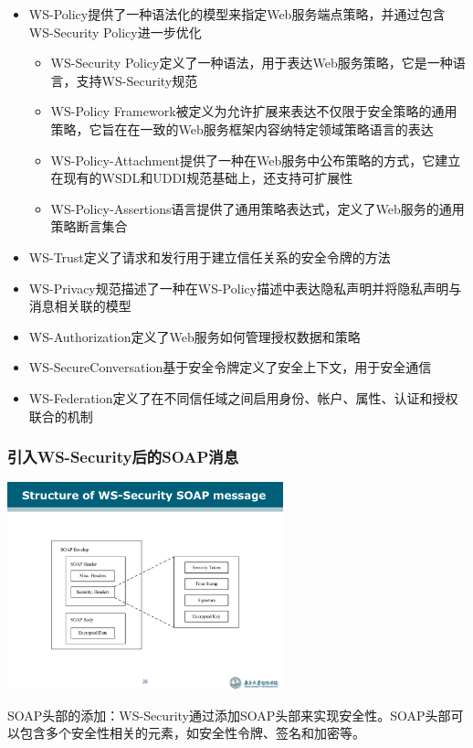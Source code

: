 \begin{itemize}
    \item WS-Policy提供了一种语法化的模型来指定Web服务端点策略，并通过包含WS-Security Policy进一步优化
    \begin{itemize}
        \item WS-Security Policy定义了一种语法，用于表达Web服务策略，它是一种语言，支持WS-Security规范
        \item WS-Policy Framework被定义为允许扩展来表达不仅限于安全策略的通用策略，它旨在在一致的Web服务框架内容纳特定领域策略语言的表达
        \item WS-Policy-Attachment提供了一种在Web服务中公布策略的方式，它建立在现有的WSDL和UDDI规范基础上，还支持可扩展性
        \item WS-Policy-Assertions语言提供了通用策略表达式，定义了Web服务的通用策略断言集合
    \end{itemize}
    \item WS-Trust定义了请求和发行用于建立信任关系的安全令牌的方法
    \item WS-Privacy规范描述了一种在WS-Policy描述中表达隐私声明并将隐私声明与消息相关联的模型
    \item WS-Authorization定义了Web服务如何管理授权数据和策略
    \item WS-SecureConversation基于安全令牌定义了安全上下文，用于安全通信
    \item WS-Federation定义了在不同信任域之间启用身份、帐户、属性、认证和授权联合的机制
\end{itemize}

\subsubsection{引入WS-Security后的SOAP消息}
\begin{table}
    \centering
    \vspace{-1.5em}
    \includegraphics[width=0.6\textwidth]{images/WS-Security SOAP消息结构.pdf}
    \vspace{-1.5em}
\end{table}
SOAP头部的添加：WS-Security通过添加SOAP头部来实现安全性。SOAP头部可以包含多个安全性相关的元素，如安全性令牌、签名和加密等。

